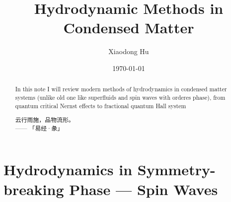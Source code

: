 \documentclass[10pt,nofootinbib]{revtex4}
\begin{document}
\title{Hydrodynamic Methods in Condensed Matter}
\author{Xiaodong Hu}

\date{\today}

\begin{abstract}
	In this note I will review modern methods of hydrodynamics in condensed matter systems (unlike old one like superfluids and spin waves with orderes phase), from quantum critical Nernst effects to fractional quantum Hall system \par
		\hfill\par
		{\centering\kaishu 云行雨施，品物流形。\\[0.5em]}
	\hfill------ 「易经·彖」
\end{abstract}

\maketitle
\tableofcontents

\section{Hydrodynamics in Symmetry-breaking Phase --- Spin Waves}
\end{document}
